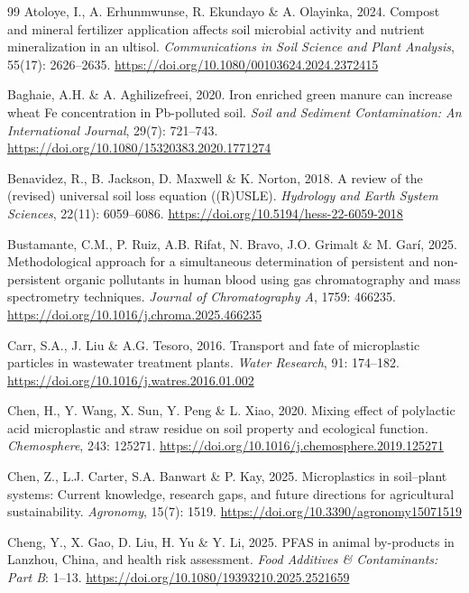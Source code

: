 \documentclass[sn-mathphys-num]{sn-jnl}
\begin{document}
\begin{thebibliography}{99}
Atoloye, I., A. Erhunmwunse, R. Ekundayo \& A. Olayinka, 2024.
Compost and mineral fertilizer application affects soil microbial activity
and nutrient mineralization in an ultisol.
\textit{Communications in Soil Science and Plant Analysis},
55(17): 2626--2635.
\url{https://doi.org/10.1080/00103624.2024.2372415}

Baghaie, A.H. \& A. Aghilizefreei, 2020.
Iron enriched green manure can increase wheat Fe concentration in Pb-polluted
soil.
\textit{Soil and Sediment Contamination: An International Journal},
29(7): 721--743.
\url{https://doi.org/10.1080/15320383.2020.1771274}

Benavidez, R., B. Jackson, D. Maxwell \& K. Norton, 2018.
A review of the (revised) universal soil loss equation ((R)USLE).
\textit{Hydrology and Earth System Sciences}, 22(11): 6059--6086.
\url{https://doi.org/10.5194/hess-22-6059-2018}

Bustamante, C.M., P. Ruiz, A.B. Rifat, N. Bravo, J.O. Grimalt \& M. Gar\'{i},
2025.
Methodological approach for a simultaneous determination of persistent and
non-persistent organic pollutants in human blood using gas chromatography and
mass spectrometry techniques.
\textit{Journal of Chromatography A}, 1759: 466235.
\url{https://doi.org/10.1016/j.chroma.2025.466235}

Carr, S.A., J. Liu \& A.G. Tesoro, 2016.
Transport and fate of microplastic particles in wastewater treatment plants.
\textit{Water Research}, 91: 174--182.
\url{https://doi.org/10.1016/j.watres.2016.01.002}

Chen, H., Y. Wang, X. Sun, Y. Peng \& L. Xiao, 2020.
Mixing effect of polylactic acid microplastic and straw residue on soil
property and ecological function.
\textit{Chemosphere}, 243: 125271.
\url{https://doi.org/10.1016/j.chemosphere.2019.125271}

Chen, Z., L.J. Carter, S.A. Banwart \& P. Kay, 2025.
Microplastics in soil--plant systems: Current knowledge, research gaps, and
future directions for agricultural sustainability.
\textit{Agronomy}, 15(7): 1519.
\url{https://doi.org/10.3390/agronomy15071519}

Cheng, Y., X. Gao, D. Liu, H. Yu \& Y. Li, 2025.
PFAS in animal by-products in Lanzhou, China, and health risk assessment.
\textit{Food Additives \& Contaminants: Part B}: 1--13.
\url{https://doi.org/10.1080/19393210.2025.2521659}


\end{thebibliography}
\end{document}
